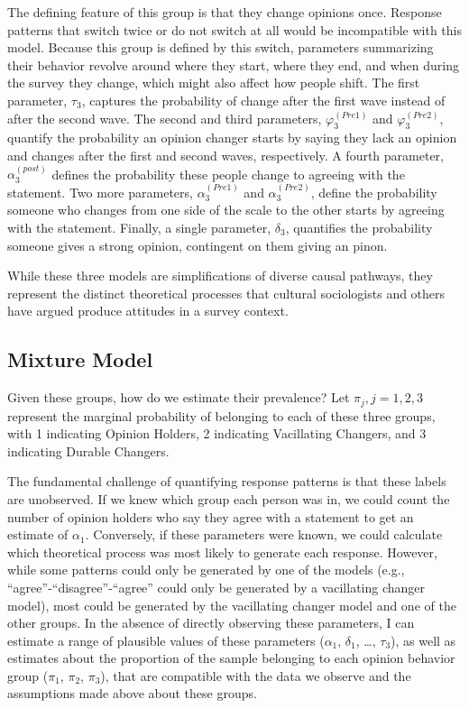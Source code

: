 \documentclass[12pt,]{article}
\begin{document}
The defining feature of this group is that they change opinions once. Response patterns that switch twice or do not switch at all would be incompatible with this model. Because this group is defined by this switch, parameters summarizing their behavior revolve around where they start, where they end, and when during the survey they change, which might also affect how people shift. The first parameter, \(\tau_3\), captures the probability of change after the first wave instead of after the second wave. The second and third parameters, \(\varphi_3^{(Pre1)}\) and \(\varphi_3^{(Pre2)}\), quantify the probability an opinion changer starts by saying they lack an opinion and changes after the first and second waves, respectively. A fourth parameter, \(\alpha_3^{(post)}\) defines the probability these people change to agreeing with the statement. Two more parameters, \(\alpha_3^{(Pre1)}\) and \(\alpha_3^{(Pre2)}\), define the probability someone who changes from one side of the scale to the other starts by agreeing with the statement. Finally, a single parameter, \(\delta_3\), quantifies the probability someone gives a strong opinion, contingent on them giving an pinon.

While these three models are simplifications of diverse causal pathways, they represent the distinct theoretical processes that cultural sociologists and others have argued produce attitudes in a survey context.

\hypertarget{mixture-model}{%
\subsection{Mixture Model}\label{mixture-model}}

Given these groups, how do we estimate their prevalence? Let \(\pi_j, j = 1, 2, 3\) represent the marginal probability of belonging to each of these three groups, with 1 indicating Opinion Holders, 2 indicating Vacillating Changers, and 3 indicating Durable Changers.

The fundamental challenge of quantifying response patterns is that these labels are unobserved. If we knew which group each person was in, we could count the number of opinion holders who say they agree with a statement to get an estimate of \(\alpha_1\). Conversely, if these parameters were known, we could calculate which theoretical process was most likely to generate each response. However, while some patterns could only be generated by one of the models (e.g., ``agree''-``disagree''-``agree'' could only be generated by a vacillating changer model), most could be generated by the vacillating changer model and one of the other groups. In the absence of directly observing these parameters, I can estimate a range of plausible values of these parameters (\(\alpha_1\), \(\delta_1\), \ldots{}, \(\tau_3\)), as well as estimates about the proportion of the sample belonging to each opinion behavior group (\(\pi_1\), \(\pi_2\), \(\pi_3\)), that are compatible with the data we observe and the assumptions made above about these groups.
\end{document}
